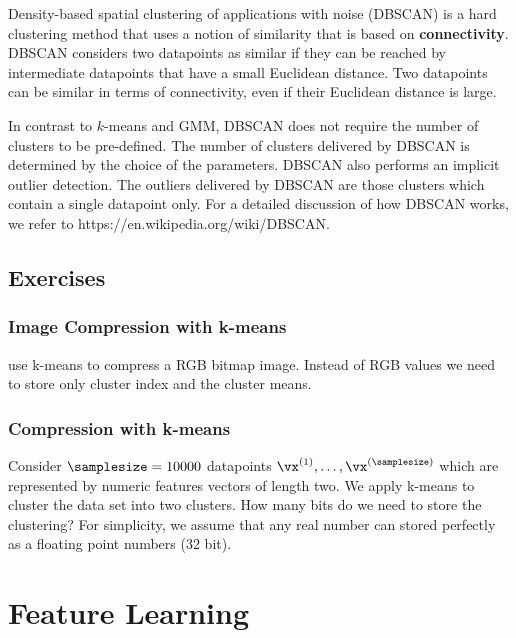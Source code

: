 \documentclass[12pt]{report}
\begin{document}
Density-based spatial clustering of applications with noise (DBSCAN) is a hard clustering method that 
uses a notion of similarity that is based on {\bf connectivity}. DBSCAN considers two datapoints as 
similar if they can be reached by intermediate datapoints that have a small Euclidean distance. Two datapoints 
can be similar in terms of connectivity, even if their Euclidean distance is large. 

In contrast to $k$-means and GMM, DBSCAN does not require the number of clusters to be pre-defined. 
The number of clusters delivered by DBSCAN is determined by the choice of the parameters. DBSCAN 
also performs an implicit outlier detection. The outliers delivered by DBSCAN are those clusters which 
contain a single datapoint only. For a detailed discussion of how DBSCAN works, we refer to https://en.wikipedia.org/wiki/DBSCAN.  

\section{Exercises} 
\subsection{Image Compression with k-means} 
use k-means to compress a RGB bitmap image. Instead of RGB values 
we need to store only cluster index and the cluster means. 

\subsection{Compression with k-means} 
Consider $\samplesize=10000$ datapoints $\vx^{(1)},\ldots,\vx^{(\samplesize)}$ 
which are represented by numeric features vectors of length two. We apply k-means 
to cluster the data set into two clusters. How many bits do we need to store the 
clustering? For simplicity, we assume that any real number can stored perfectly 
as a floating point numbers ($32$ bit). 


\newpage
\chapter{Feature Learning} 
\label{ch_FeatureLearning}
\end{document}
